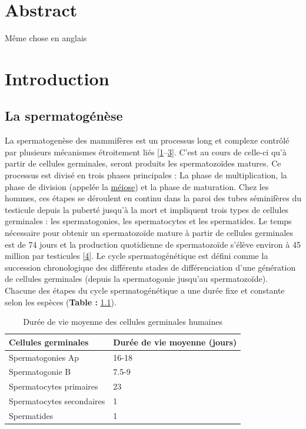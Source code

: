 \documentclass[12pt,twoside]{reedthesis}
\theoremstyle{definition}
\theoremstyle{definition}
\theoremstyle{remark}
\begin{document}
  \newpage
  
  \chapter*{Abstract}\label{abstract}
  
  \newpage
  
  Même chose en anglais
  
  \chapter{Introduction}\label{introInf}
  
  \section{La spermatogénèse}\label{la-spermatogenese}
  
  La spermatogenèse des mammifères est un processus long et complexe
  contrôlé par plusieurs mécanismes étroitement liés
  {[}\protect\hyperlink{ref-Gnessi1997}{1}--\protect\hyperlink{ref-KIERSZENBAUM1994}{3}{]}.
  C'est au cours de celle-ci qu'à partir de cellules germinales, seront
  produits les spermatozoïdes matures. Ce processus est divisé en trois
  phases principales : La phase de multiplication, la phase de division
  (appelée la \protect\hyperlink{meiose}{méiose}) et la phase de
  maturation. Chez les hommes, ces étapes se déroulent en continu dans la
  paroi des tubes séminifères du testicule depuis la puberté jusqu'à la
  mort et impliquent trois types de cellules germinales : les
  spermatogonies, les spermatocytes et les spermatides. Le temps
  nécessaire pour obtenir un spermatozoïde mature à partir de cellules
  germinales est de 74 jours et la production quotidienne de spermatozoïde
  s'élève environ à 45 million par testicules
  {[}\protect\hyperlink{ref-Johnson1980}{4}{]}. Le cycle spermatogénétique
  est défini comme la succession chronologique des différents stades de
  différenciation d'une génération de cellules germinales (depuis la
  spermatogonie jusqu'au spermatozoïde). Chacune des étapes du cycle
  spermatogénétique a une durée fixe et constante selon les espèces
  (\textbf{Table : }\ref{tab:spermatotime}).
  
  \begin{longtable}[t]{ll}
  \caption{\label{tab:spermatotime}Durée de vie moyenne des cellules germinales humaines}\\
  \toprule
  Cellules germinales & Durée de vie moyenne (jours)\\
  \midrule
  Spermatogonies Ap & 16-18\\
  Spermatogonie B & 7.5-9\\
  Spermatocytes primaires & 23\\
  Spermatocytes secondaires & 1\\
  Spermatides & 1\\
  \bottomrule
  \end{longtable}
  
\end{document}

